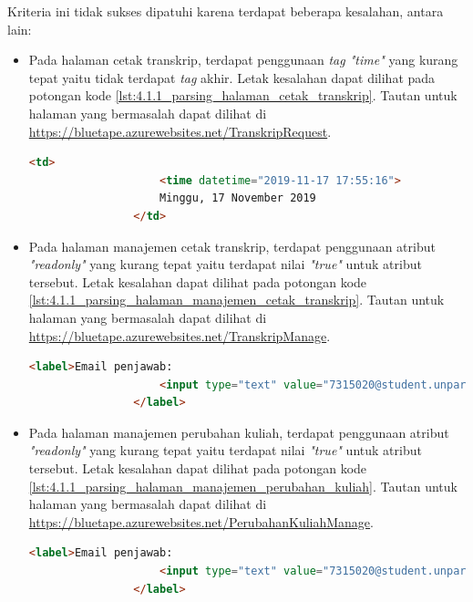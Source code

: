 \documentclass[a4paper,twoside]{article}
\begin{document}
\begin{enumerate}
		Kriteria ini tidak sukses dipatuhi karena terdapat beberapa kesalahan, antara lain:

		\begin{itemize}
			\item Pada halaman cetak transkrip, terdapat penggunaan \textit{tag "time"} yang kurang tepat yaitu tidak terdapat \textit{tag} akhir. Letak kesalahan dapat dilihat pada potongan kode \ref{lst:4.1.1_parsing_halaman_cetak_transkrip}. Tautan untuk halaman yang bermasalah dapat dilihat di \url{https://bluetape.azurewebsites.net/TranskripRequest}.
			\begin{lstlisting}[frame=single, label={lst:4.1.1_parsing_halaman_cetak_transkrip}, language=HTML, caption=Kriteria Sukses 4.1.1 - Kesalahan Elemen pada Halaman Cetak Transkrip]
				<td>
					<time datetime="2019-11-17 17:55:16">
					Minggu, 17 November 2019
				</td>
			\end{lstlisting}
			
			\item Pada halaman manajemen cetak transkrip, terdapat penggunaan atribut \textit{"readonly"} yang kurang tepat yaitu terdapat nilai \textit{"true"} untuk atribut tersebut. Letak kesalahan dapat dilihat pada potongan kode \ref{lst:4.1.1_parsing_halaman_manajemen_cetak_transkrip}. Tautan untuk halaman yang bermasalah dapat dilihat di \url{https://bluetape.azurewebsites.net/TranskripManage}.
			\begin{lstlisting}[frame=single, label={lst:4.1.1_parsing_halaman_manajemen_cetak_transkrip}, language=HTML, caption=Kriteria Sukses 4.1.1 - Kesalahan Elemen pada Halaman Manajemen Cetak Transkrip]
				<label>Email penjawab:
					<input type="text" value="7315020@student.unpar.ac.id" readonly="true"/>
				</label>
			\end{lstlisting}
			
			\item Pada halaman manajemen perubahan kuliah, terdapat penggunaan atribut \textit{"readonly"} yang kurang tepat yaitu terdapat nilai \textit{"true"} untuk atribut tersebut. Letak kesalahan dapat dilihat pada potongan kode \ref{lst:4.1.1_parsing_halaman_manajemen_perubahan_kuliah}. Tautan untuk halaman yang bermasalah dapat dilihat di \url{https://bluetape.azurewebsites.net/PerubahanKuliahManage}.
			\begin{lstlisting}[frame=single, label={lst:4.1.1_parsing_halaman_manajemen_perubahan_kuliah}, language=HTML, caption=Kriteria Sukses 4.1.1 - Kesalahan Elemen pada Halaman Manajemen Perubahan Kuliah]
				<label>Email penjawab:
					<input type="text" value="7315020@student.unpar.ac.id" readonly="true"/>
				</label>
			\end{lstlisting}


\end{itemize}
\end{enumerate}
\end{document}
